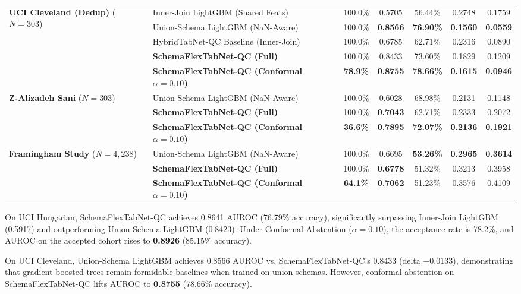 \documentclass[journal]{IEEEtran}
\begin{document}
\begin{table}[t]
\begin{tabular}{llccccc}
\midrule
\multirow{5}{*}{\textbf{UCI Cleveland (Dedup)} ($N=303$)}
 & Inner-Join LightGBM (Shared Feats) & 100.0\% & 0.5705 & 56.44\% & 0.2748 & 0.1759 \\
 & Union-Schema LightGBM (NaN-Aware)  & 100.0\% & \textbf{0.8566} & \textbf{76.90\%} & \textbf{0.1560} & \textbf{0.0559} \\
 & HybridTabNet-QC Baseline (Inner-Join) & 100.0\% & 0.6785 & 62.71\% & 0.2316 & 0.0890 \\
 & \textbf{SchemaFlexTabNet-QC (Full)} & 100.0\% & 0.8433 & 73.60\% & 0.1829 & 0.1209 \\
 & \textbf{SchemaFlexTabNet-QC (Conformal $\alpha=0.10$)} & \textbf{78.9\%} & \textbf{0.8755} & \textbf{78.66\%} & \textbf{0.1615} & \textbf{0.0946} \\
\midrule
\multirow{3}{*}{\textbf{Z-Alizadeh Sani} ($N=303$)}
 & Union-Schema LightGBM (NaN-Aware)  & 100.0\% & 0.6028 & 68.98\% & 0.2131 & 0.1148 \\
 & \textbf{SchemaFlexTabNet-QC (Full)} & 100.0\% & \textbf{0.7043} & 62.71\% & 0.2333 & 0.2072 \\
 & \textbf{SchemaFlexTabNet-QC (Conformal $\alpha=0.10$)} & \textbf{36.6\%} & \textbf{0.7895} & \textbf{72.07\%} & \textbf{0.2136} & \textbf{0.1921} \\
\midrule
\multirow{3}{*}{\textbf{Framingham Study} ($N=4,238$)}
 & Union-Schema LightGBM (NaN-Aware)  & 100.0\% & 0.6695 & \textbf{53.26\%} & \textbf{0.2965} & \textbf{0.3614} \\
 & \textbf{SchemaFlexTabNet-QC (Full)} & 100.0\% & \textbf{0.6778} & 51.32\% & 0.3213 & 0.3958 \\
 & \textbf{SchemaFlexTabNet-QC (Conformal $\alpha=0.10$)} & \textbf{64.1\%} & \textbf{0.7062} & 51.23\% & 0.3576 & 0.4109 \\
\bottomrule
\end{tabular}
\end{table}

On UCI Hungarian, SchemaFlexTabNet-QC achieves 0.8641 AUROC (76.79\% accuracy), significantly surpassing Inner-Join LightGBM (0.5917) and outperforming Union-Schema LightGBM (0.8423). Under Conformal Abstention ($\alpha=0.10$), the acceptance rate is 78.2\%, and AUROC on the accepted cohort rises to \textbf{0.8926} (85.15\% accuracy).

On UCI Cleveland, Union-Schema LightGBM achieves 0.8566 AUROC vs. SchemaFlexTabNet-QC's 0.8433 (delta $-0.0133$), demonstrating that gradient-boosted trees remain formidable baselines when trained on union schemas. However, conformal abstention on SchemaFlexTabNet-QC lifts AUROC to \textbf{0.8755} (78.66\% accuracy).
\end{document}
